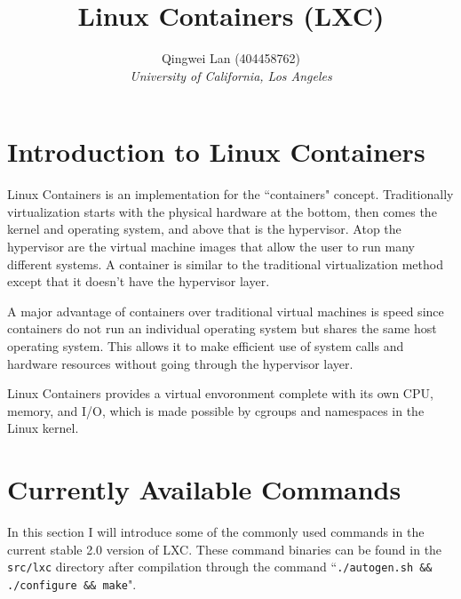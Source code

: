 \documentclass[12pt]{article}
\begin{document}
\title{Linux Containers (LXC)}
\author{Qingwei Lan (404458762)\\ \textit{University of California, Los Angeles}}
\maketitle

\newenvironment{dent}{\begin{adjustwidth}{0.35in}{}}{\end{adjustwidth}}



\section{Introduction to Linux Containers}

Linux Containers is an implementation for the ``containers" concept. Traditionally virtualization starts with the physical hardware at the bottom, then comes the kernel and operating system, and above that is the hypervisor. Atop the hypervisor are the virtual machine images that allow the user to run many different systems. A container is similar to the traditional virtualization method except that it doesn't have the hypervisor layer.

A major advantage of containers over traditional virtual machines is speed since containers do not run an individual operating system but shares the same host operating system. This allows it to make efficient use of system calls and hardware resources without going through the hypervisor layer.

Linux Containers provides a virtual envoronment complete with its own CPU, memory, and I/O, which is made possible by cgroups and namespaces in the Linux kernel.



\section{Currently Available Commands}

In this section I will introduce some of the commonly used commands in the current stable 2.0 version of LXC. These command binaries can be found in the \texttt{src/lxc} directory after compilation through the command ``\texttt{./autogen.sh \&\& ./configure \&\& make}".
\end{document}
